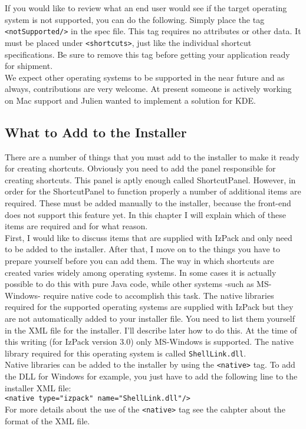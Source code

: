 If you would like to review what an end user would see if the target
operating system is not supported, you can do the following. Simply
place the tag \texttt{<notSupported/>} in the spec file. This tag requires no
attributes or other data. It must be placed under \texttt{<shortcuts>}, just like
the individual shortcut specifications. Be sure to remove this tag
before getting your application ready for shipment.\\

We expect other operating systems to be supported in the near future and
as always, contributions are very welcome. At present someone is
actively working on Mac support and  Julien wanted to implement a
solution for KDE.\\

\subsection{What to Add to the Installer}

There are a number of things that you must add to the installer to make
it ready for creating shortcuts. Obviously you need to add the panel
responsible for creating shortcuts. This panel is aptly enough called
ShortcutPanel. However, in order for the ShortcutPanel to function
properly a number of additional items are required. These must be added
manually to the installer, because the front-end does not support this
feature yet. In this chapter I will explain which of these items are
required and for what reason.\\

First, I would like to discuss items that are supplied with IzPack and
only need to be added to the installer. After that, I move on to the
things you have to prepare yourself before you can add them. The way in
which shortcuts are created varies widely among operating systems. In
some cases it is actually possible to do this with pure Java code, while
other systems -such as MS-Windows- require native code to accomplish
this task. The native libraries required for the supported operating
systems are supplied with IzPack but they are not automatically added to
your installer file. You need to list them yourself in the XML file for
the installer. I'll describe later how to do this. At the time of this
writing (for IzPack version 3.0) only MS-Windows is supported. The
native library required for this operating system is called
\texttt{ShellLink.dll}.\\

Native libraries can be added to the installer by using the
\texttt{<native>} tag. To add the DLL for Windows for example, you just
have to add the following line to the installer XML file:\\
\texttt{<native type="izpack" name="ShellLink.dll"/>}\\
For more details about the use of the \texttt{<native>} tag see the
cahpter about the format of the XML file.\\

